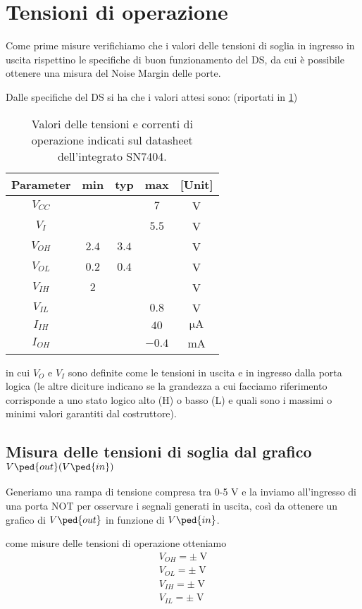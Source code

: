 \documentclass[10pt, a4paper, italian]{article}
\begin{document}
\section{Tensioni di operazione}\label{sec: tens}
Come prime misure verifichiamo che i valori delle tensioni di soglia in
ingresso in uscita rispettino le specifiche di buon funzionamento del DS,
da cui è possibile ottenere una misura del Noise Margin delle porte.

Dalle specifiche del DS si ha che i valori attesi sono: (riportati in
\cref{tab: notDS})
\begin{table}[htb]
\centering
\begin{tabular}{cccc|c}
\toprule
Parameter  & min & typ & max & [Unit] \\
\midrule
\midrule
$V_{CC}$ &  &  & $7$ & V \\
$V_I$	 &  &  & $5.5$ & V\\
$V_{OH}$ & $2.4$  & $3.4$ & & V \\
$V_{OL}$ & $0.2$  & $0.4$ & & V \\
$V_{IH}$ & $2$  &  & & V  \\
$V_{IL}$ &  &  & $0.8$ & V \\
$I_{IH}$ &  &  & $40$ & $\si{\micro\A}$ \\
$I_{OH}$ &  &  & $-0.4$ & mA \\
\bottomrule 
\end{tabular}
\caption{Valori delle tensioni e correnti di operazione indicati sul
datasheet dell'integrato SN7404.}
\label{tab: notDS}
\end{table}

in cui $V_O$ e $V_I$ sono definite come le tensioni in uscita e in ingresso
dalla porta logica (le altre diciture indicano se la grandezza a cui facciamo
riferimento corrisponde a uno stato logico alto (H) o basso (L) e quali sono
i massimi o minimi valori garantiti dal costruttore).

\subsection{Misura delle tensioni di soglia dal grafico
$V\ped{out}(V\ped{in})$}
Generiamo una rampa di tensione compresa tra 0-5 V e la inviamo
all'ingresso di una porta NOT per osservare i segnali generati in uscita,
così da ottenere un grafico di $V\ped{out}$ in funzione di $V\ped{in}$.

come misure delle tensioni di operazione otteniamo
\begin{align*}
V_{OH} = \pm \; \si{\V} \\
V_{OL}= \pm \; \si{\V} \\
V_{IH} = \pm \; \si{\V} \\
V_{IL} = \pm \; \si{\V} \\
\end{align*}
\end{document}
